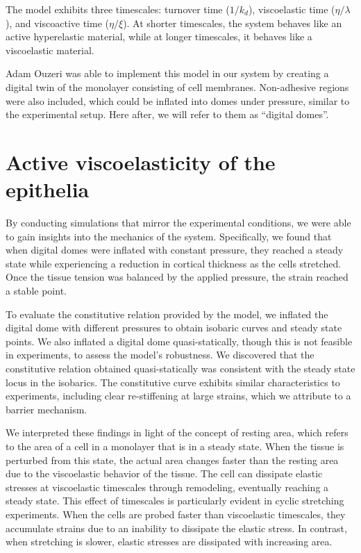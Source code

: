 The model exhibits three timescales: turnover time (\(1/k_d\)),
viscoelastic time (\(\eta/\lambda\)), and viscoactive time
(\(\eta/\xi\)). At shorter timescales, the system behaves like an active
hyperelastic material, while at longer timescales, it behaves like a
viscoelastic material.

Adam Ouzeri was able to implement this model in our system by creating a
digital twin of the monolayer consisting of cell membranes. Non-adhesive
regions were also included, which could be inflated into domes under
pressure, similar to the experimental setup. Here after, we will refer
to them as ``digital domes''.

\hypertarget{active-viscoelasticity-of-the-epithelia}{%
	\section{Active viscoelasticity of the
		epithelia}\label{active-viscoelasticity-of-the-epithelia}}

By conducting simulations that mirror the experimental conditions, we
were able to gain insights into the mechanics of the system.
Specifically, we found that when digital domes were inflated with
constant pressure, they reached a steady state while experiencing a
reduction in cortical thickness as the cells stretched. Once the tissue
tension was balanced by the applied pressure, the strain reached a
stable point.

To evaluate the constitutive relation provided by the model, we inflated
the digital dome with different pressures to obtain isobaric curves and
steady state points. We also inflated a digital dome quasi-statically,
though this is not feasible in experiments, to assess the model's
robustness. We discovered that the constitutive relation obtained
quasi-statically was consistent with the steady state locus in the
isobarics. The constitutive curve exhibits similar characteristics to
experiments, including clear re-stiffening at large strains, which we
attribute to a barrier mechanism.

We interpreted these findings in light of the concept of resting area,
which refers to the area of a cell in a monolayer that is in a steady
state. When the tissue is perturbed from this state, the actual area
changes faster than the resting area due to the viscoelastic behavior of
the tissue. The cell can dissipate elastic stresses at viscoelastic
timescales through remodeling, eventually reaching a steady state. This
effect of timescales is particularly evident in cyclic stretching
experiments. When the cells are probed faster than viscoelastic
timescales, they accumulate strains due to an inability to dissipate the
elastic stress. In contrast, when stretching is slower, elastic stresses
are dissipated with increasing area.

